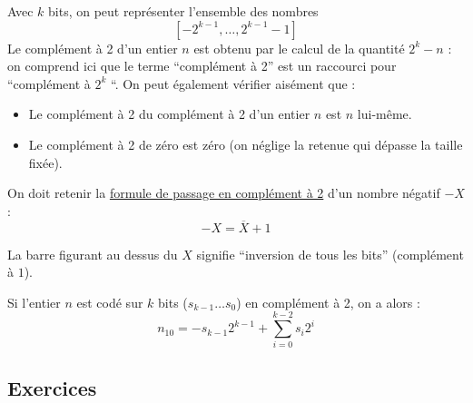 \documentclass[a4paper,11pt]{article}
\begin{document}
Avec $k$ bits, on peut représenter l'ensemble des nombres $$[-2^{k-1},\dots,2^{k-1}-1]$$ Le complément à 2 d'un entier $n$ est obtenu par le calcul de la quantité $2^k - n$ : on comprend ici que le terme ``complément à 2'' est un raccourci pour ``complément à $2^k$ ``. On peut également vérifier aisément que :
\begin{itemize}
\item Le complément à 2 du complément à 2 d'un entier $n$ est $n$ lui-même.
\item Le complément à 2 de zéro est zéro (on néglige la retenue qui dépasse la taille fixée).
\end{itemize}

On doit retenir la \underline{formule de passage en complément à 2} d'un nombre négatif $-X$ :
\begin{equation}
-X=\overline{X}+1
\end{equation}

La barre figurant au dessus du $X$ signifie ``inversion de tous les bits'' (complément à $1$).

Si l'entier $n$ est codé sur $k$ bits ($s_{k-1}\dots s_0$) en complément à 2, on a alors :
\begin{equation}
n_{10}=-s_{k-1}2^{k-1}+\sum_{i=0}^{k-2} s_i2^i
\end{equation}

\subsection*{Exercices}
\end{document}
